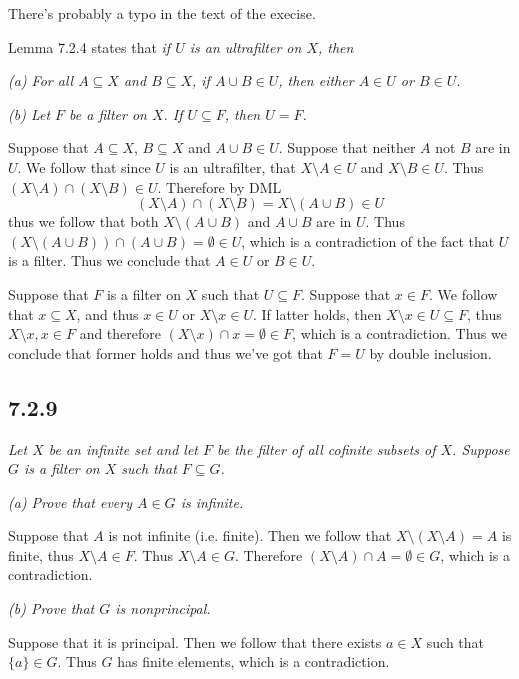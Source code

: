 \documentclass[11pt,oneside,titlepage]{book}
\newcommand{\set}[1]{\{ #1 \}}
\begin{document}
There's probably a typo in the text of the execise.

Lemma 7.2.4 states that \textit{if $U$ is an ultrafilter on $X$, then}

\textit{(a) For all $A \subseteq X$ and $B \subseteq X$, if $A \cup B \in U$, then either $A \in U$
or $B \in U$.}

\textit{(b) Let $F$ be a filter on $X$. If $U \subseteq F$, then $U = F$.}

Suppose that $A \subseteq X$, $B \subseteq X$ and $A \cup B \in U$. Suppose that neither
$A$ not $B$ are in $U$. We follow that since $U$ is an ultrafilter, that
$X \setminus A \in U$ and $X \setminus B \in U$. Thus
$(X \setminus A) \cap (X \setminus B) \in U$. Therefore by DML
$$(X \setminus A) \cap (X \setminus B) = X \setminus (A \cup B) \in U$$
thus we follow that both $X \setminus (A \cup B)$ and $A \cup B$ are in $U$. Thus
$(X \setminus (A \cup B)) \cap (A \cup B) = \emptyset \in U$, which is a contradiction
of the fact that $U$ is a filter. Thus we conclude that $A \in U$ or $B \in U$.

Suppose that $F$ is a filter on $X$ such that $U \subseteq F$. Suppose that $x \in F$.
We follow that $x \subseteq X$, and thus $x \in U$ or $X \setminus x \in U$.
If latter holds, then $X \setminus x \in U \subseteq F$, thus $X \setminus x, x \in F$
and therefore $(X \setminus x) \cap x = \emptyset \in F$, which is a contradiction. Thus we
conclude that former holds and thus we've got that $F = U$ by double inclusion.

\subsection*{7.2.9}

\textit{Let $X$ be an infinite set and let $F$ be the filter of all cofinite subsets of $X$.
  Suppose $G$ is a filter on $X$ such that $F \subseteq G$.}

\textit{(a) Prove that every $A \in G$ is infinite.}

Suppose that $A$ is not infinite (i.e. finite). Then we follow that 
$X \setminus (X \setminus A) = A$ is finite, thus $X \setminus A \in F$. Thus
$X \setminus A \in G$. Therefore $(X \setminus A) \cap A = \emptyset \in G$, which is a
contradiction.

\textit{(b) Prove that $G$ is nonprincipal.}

Suppose that it is principal. Then we follow that there exists $a \in X$ such that
$\set{a} \in G$. Thus $G$ has finite elements, which is a contradiction.
\end{document}
